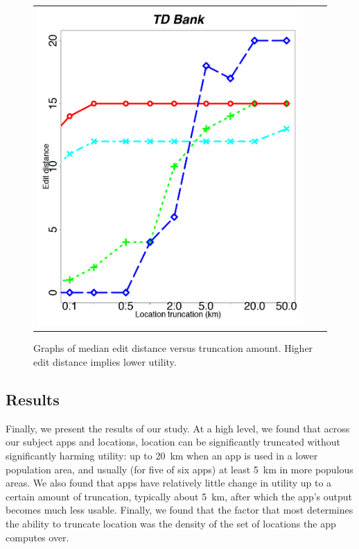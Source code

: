 \begin{figure}[t!]
\begin{tabular}{ccc}
    \begin{minipage}{2in}
      \includegraphics[width=\textwidth]
                      {location_privacy/data/tdbank/plots/medians_across_city_20}
    \end{minipage}
  \end{tabular}
  \caption{Graphs of median edit distance versus truncation
    amount. Higher edit distance implies lower utility.}
  \label{fig:edit-distance-metric}
\end{figure}

\subsection{Results}
\label{sec:results}

Finally, we present the results of our study. At a high level, we
found that across our
subject apps and locations, location can be
significantly truncated without significantly harming utility: up to 20~km
when an app is used in a lower population area, and usually (for five of six apps) 
at least 5~km in more populous areas.  We also found that apps have relatively little 
change in utility up to a certain amount of truncation, typically
about 5~km, after 
which the app's output becomes much less usable.  Finally, we found that the factor 
that most determines the ability to truncate location was the density
of the set of locations the app computes over.

